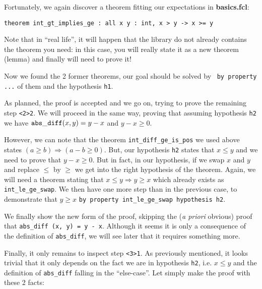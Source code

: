 \documentclass[11pt,a4paper,twoside,onecolumn,fullpage]{article}
\begin{document}
Fortunately, we again discover a theorem fitting our expectations in
\textbf{basics.fcl}:

{\scriptsize
\begin{lstlisting}
theorem int_gt_implies_ge : all x y : int, x > y -> x >= y
\end{lstlisting}}

Note that in ``real life'', it will happen that the library do not already
contains the theorem you need: in this case, you will really state it
as a new theorem (lemma) and finally will need to prove it!

Now we found the 2 former theorems, our goal should be solved by
\zenon\ \lstinline"by property ..." of them and the hypothesis
\lstinline"h1".

{\scriptsize
}

As planned, the proof is accepted and we go on, trying to prove the
remaining step \lstinline"<2>2". We will proceed in the same way,
proving that assuming hypothesis \lstinline"h2" we have
${\tt abs\_diff} (x, y) = y - x$ and $y - x \ge 0$.

However, we can note that the theorem \lstinline"int_diff_ge_is_pos"
we used above states  $(a \ge b) \Rightarrow (a - b \ge 0)$.
But, our hypothesis \lstinline"h2" states that $x \le y$ and we need
to prove that $y -x \ge 0$. But in fact, in our hypothesis, if we swap $x$ and
$y$ and replace $\le$ by $\ge$ we get into the right hypothesis of the
theorem. Again, we will need a theorem stating that
$x \le y \Rightarrow y \ge x$ which already exists as
\lstinline"int_le_ge_swap". We then have one more step than in the
previous case, to demonstrate that $y \ge x$
\lstinline"by property int_le_ge_swap hypothesis h2".

\medskip
We finally show the new form of the proof, skipping the ({\em a priori}
obvious) proof that {\tt abs\_diff (x, y) = y - x}. Although it seems
it is only a consequence of the definition of \lstinline{abs_diff}, we
will see later that it requires something more.

{\scriptsize
}

Finally, it only remains to inspect step \lstinline"<3>1". As
previously mentioned, it looks trivial that it only depends on the
fact we are in hypothesis \lstinline"h2", i.e. $x \le y$ and the
definition of \lstinline"abs_diff" falling in the ``else-case''. Let
simply make the proof with these 2 facts:
\end{document}
